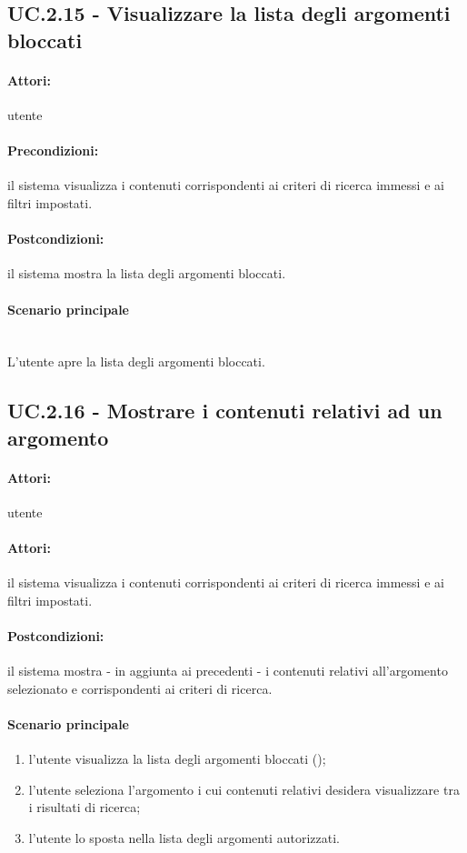 \documentclass[10pt,a4paper,headinclude,footinclude,hidelinks]{scrreprt} %
\begin{document}
	\subsection[UC.2.15]{UC.2.15 - Visualizzare la lista degli argomenti bloccati}
	\label{sec:stage:ar:uc:2_15}
	\paragraph{Attori:} utente
	\paragraph{Precondizioni:} il sistema visualizza i contenuti corrispondenti ai criteri di ricerca immessi e ai filtri impostati.
	\paragraph{Postcondizioni:} il sistema mostra la lista degli argomenti bloccati.
	\paragraph{Scenario principale} \hfill \\
	L'utente apre la lista degli argomenti bloccati.

	\subsection[UC.2.16]{UC.2.16 - Mostrare i contenuti relativi ad un argomento}
	\label{sec:stage:ar:uc:2_16}
	\paragraph{Attori:} utente
	\paragraph{Attori:} il sistema visualizza i contenuti corrispondenti ai criteri di ricerca immessi e ai filtri impostati.
	\paragraph{Postcondizioni:} il sistema mostra - in aggiunta ai precedenti - i contenuti relativi all'argomento selezionato e corrispondenti ai criteri di ricerca.
	\paragraph{Scenario principale}
	\begin{enumerate}
	\item l'utente visualizza la lista degli argomenti bloccati ();
	\item l'utente seleziona l'argomento i cui contenuti relativi desidera visualizzare tra i risultati di ricerca;
	\item l'utente lo sposta nella lista degli argomenti autorizzati.
	\end{enumerate}
\end{document}
